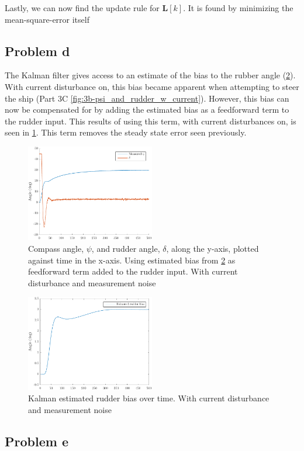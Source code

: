 Lastly, we can now find the update rule for $\bm{L}[k]$. It is found by minimizing the mean-square-error itself

\subsection{Problem d}
The Kalman filter gives access to an estimate of the bias to the rubber angle (\cref{fig:5d-estimated_rudder_bias}).  With current disturbance on, this bias became apparent when attempting to steer the ship (Part 3C \cref{fig:3b-psi_and_rudder_w_current}).  However, this bias can now be compensated for by adding the estimated bias as a feedforward term to the rudder input.  This results of using this term, with current disturbances on, is seen in \cref{fig:5d-psi_and_rudder}.  This term removes the steady state error seen previously.

\begin{figure}[ht]
    \centering
    \includegraphics[width=0.5\textwidth]{images/5d-psi_and_rudder}
    \caption{Compass angle, $\psi$, and rudder angle, $\delta$, along the y-axis, plotted against time in the x-axis. Using estimated bias from \cref{fig:5d-estimated_rudder_bias} as feedforward term added to the rudder input. With current disturbance and measurement noise}
    \label{fig:5d-psi_and_rudder}
\end{figure}

\begin{figure}[ht]
    \centering
    \includegraphics[width=0.5\textwidth]{images/5d-estimated_rudder_bias}
    \caption{Kalman estimated rudder bias over time. With current disturbance and measurement noise}
    \label{fig:5d-estimated_rudder_bias}
\end{figure}

\subsection{Problem e}
